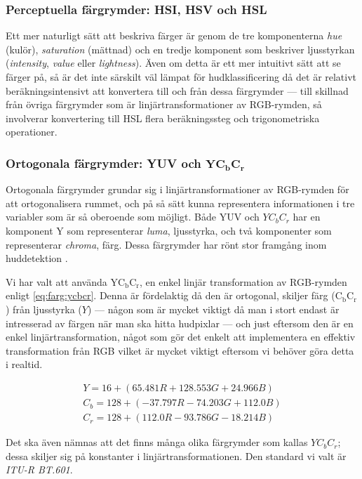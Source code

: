 \documentclass[../rapport_MVEX01-11-05]{subfiles}
\begin{document}
\subsubsection{Perceptuella färgrymder: HSI, HSV och HSL}

Ett mer naturligt sätt att beskriva färger är genom de tre
komponenterna \emph{hue} (kulör), \emph{saturation} (mättnad) och en
tredje komponent som beskriver ljusstyrkan (\emph{intensity},
\emph{value} eller \emph{lightness}). Även om detta är ett mer
intuitivt sätt att se färger på, så är det inte särskilt väl lämpat
för hudklassificering då det är relativt beräkningsintensivt att
konvertera till och från dessa färgrymder --- till skillnad från
övriga färgrymder som är linjärtransformationer av RGB-rymden, så
involverar konvertering till HSL flera beräkningssteg och
trigonometriska operationer.

\subsubsection[Ortogonala färgrymder: YUV och $\mathrm{YC_bC_r}$]{Ortogonala färgrymder: YUV och $\mathbf{YC_bC_r}$}

Ortogonala färgrymder grundar sig i linjärtransformationer av
RGB-rymden för att ortogonalisera rummet, och på så sätt kunna
representera informationen i tre variabler som är så oberoende som
möjligt. Både YUV och $YC_bC_r$ har en komponent Y som representerar
\emph{luma}, ljusstyrka, och två komponenter som representerar
\emph{chroma}, färg. Dessa färgrymder har rönt stor framgång inom
huddetektion \cite{Hsu02,Elmezain08,Hassanpour08}.

Vi har valt att använda $\mathrm{YC_bC_r}$, en enkel linjär transformation av
RGB-rymden enligt \eqref{eq:farg:ycbcr}. Denna är fördelaktig då den
är ortogonal, skiljer färg ($\mathrm{C_bC_r}$) från ljusstyrka ($Y$) --- någon
som är mycket viktigt då man i stort endast är intresserad av färgen
när man ska hitta hudpixlar --- och just eftersom den är en enkel
linjärtransformation, något som gör det enkelt att implementera en
effektiv transformation från RGB vilket är mycket viktigt eftersom vi
behöver göra detta i realtid.

\begin{equation}
  \label{eq:farg:ycbcr}
  \begin{gathered}
  Y   = 16  + ( 65.481R + 128.553G + 24.966B)\\
  C_b = 128 + (-37.797R - 74.203G  + 112.0B )\\
  C_r = 128 + (112.0R   - 93.786G  - 18.214B)
  \end{gathered}
\end{equation}

Det ska även nämnas att det finns många olika färgrymder som kallas
$YC_bC_r$; dessa skiljer sig på konstanter i linjärtransformationen.
Den standard vi valt är \emph{ITU-R BT.601}.
\end{document}
